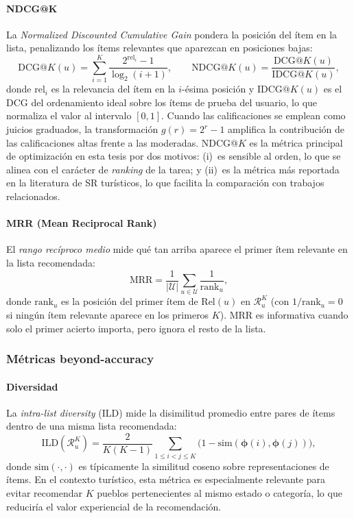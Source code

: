 \paragraph{NDCG@K}
La \textit{Normalized Discounted Cumulative Gain} pondera la posición del ítem en la lista, penalizando los ítems relevantes que aparezcan en posiciones bajas:
\begin{equation} \label{eq:dcg}
	\text{DCG@}K(u) = \sum_{i=1}^{K} \frac{2^{\text{rel}_i} - 1}{\log_2(i+1)}, \qquad \text{NDCG@}K(u) = \frac{\text{DCG@}K(u)}{\text{IDCG@}K(u)},
\end{equation}
donde $\text{rel}_i$ es la relevancia del ítem en la $i$-ésima posición y $\text{IDCG@}K(u)$ es el DCG del ordenamiento ideal sobre los ítems de prueba del usuario, lo que normaliza el valor al intervalo $[0, 1]$. Cuando las calificaciones se emplean como juicios graduados, la transformación $g(r) = 2^{r}-1$ amplifica la contribución de las calificaciones altas frente a las moderadas. NDCG@$K$ es la métrica principal de optimización en esta tesis por dos motivos: (i)~es sensible al orden, lo que se alinea con el carácter de \textit{ranking} de la tarea; y (ii)~es la métrica más reportada en la literatura de SR turísticos, lo que facilita la comparación con trabajos relacionados.

\paragraph{MRR (Mean Reciprocal Rank)}
El \textit{rango recíproco medio} mide qué tan arriba aparece el primer ítem relevante en la lista recomendada:
\begin{equation} \label{eq:mrr}
	\text{MRR} = \frac{1}{|\mathcal{U}|} \sum_{u \in \mathcal{U}} \frac{1}{\text{rank}_u},
\end{equation}
donde $\text{rank}_u$ es la posición del primer ítem de $\text{Rel}(u)$ en $\mathcal{R}_u^K$ (con $1/\text{rank}_u = 0$ si ningún ítem relevante aparece en los primeros $K$). MRR es informativa cuando solo el primer acierto importa, pero ignora el resto de la lista.

\subsubsection{Métricas beyond-accuracy} \label{subsubsec:beyond_accuracy}

\paragraph{Diversidad}
La \textit{intra-list diversity} (ILD) mide la disimilitud promedio entre pares de ítems dentro de una misma lista recomendada:
\begin{equation} \label{eq:ild}
	\text{ILD}(\mathcal{R}_u^K) = \frac{2}{K(K-1)} \sum_{1 \leq i < j \leq K} \bigl(1 - \mathrm{sim}(\boldsymbol{\phi}(i), \boldsymbol{\phi}(j))\bigr),
\end{equation}
donde $\mathrm{sim}(\cdot, \cdot)$ es típicamente la similitud coseno sobre representaciones de ítems. En el contexto turístico, esta métrica es especialmente relevante para evitar recomendar $K$ pueblos pertenecientes al mismo estado o categoría, lo que reduciría el valor experiencial de la recomendación.

